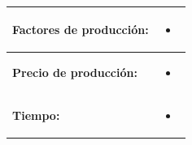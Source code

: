 \documentclass{article}
\begin{document}
\begin{center}
\begin{longtable}{ | p{4.5cm} | p{11.5cm} | }
        \hline
            \textbf{Factores de producción: } & 
            \begin{itemize}
                \item 
            \end{itemize} \\ 
        \hline
        
        \hline
            \textbf{Precio de producción: } & 
            \begin{itemize}
                \item 
            \end{itemize} \\ 
        \hline
        
        \hline
            \textbf{Tiempo: } & 
            \begin{itemize}
                \item 
            \end{itemize}  \\ 
        \hline
        
   \end{longtable}
\end{center}




\end{document}
